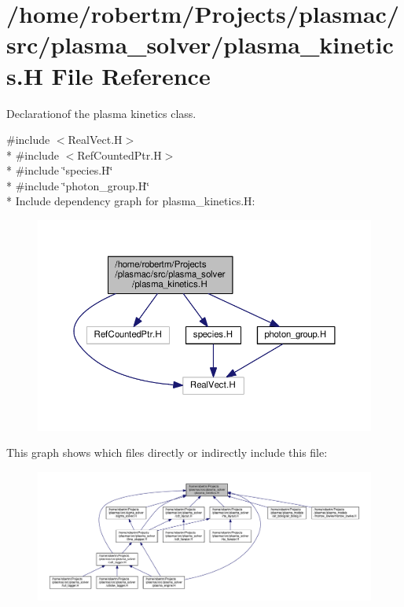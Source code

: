 \hypertarget{plasma__kinetics_8H}{}\section{/home/robertm/\+Projects/plasmac/src/plasma\+\_\+solver/plasma\+\_\+kinetics.H File Reference}
\label{plasma__kinetics_8H}


Declarationof the plasma kinetics class.  


{\ttfamily \#include $<$Real\+Vect.\+H$>$}\\*
{\ttfamily \#include $<$Ref\+Counted\+Ptr.\+H$>$}\\*
{\ttfamily \#include \char`\"{}species.\+H\char`\"{}}\\*
{\ttfamily \#include \char`\"{}photon\+\_\+group.\+H\char`\"{}}\\*
Include dependency graph for plasma\+\_\+kinetics.\+H\+:\nopagebreak
\begin{figure}[H]
\begin{center}
\leavevmode
\includegraphics[width=350pt]{plasma__kinetics_8H__incl}
\end{center}
\end{figure}
This graph shows which files directly or indirectly include this file\+:\nopagebreak
\begin{figure}[H]
\begin{center}
\leavevmode
\includegraphics[width=350pt]{plasma__kinetics_8H__dep__incl}
\end{center}
\end{figure}
